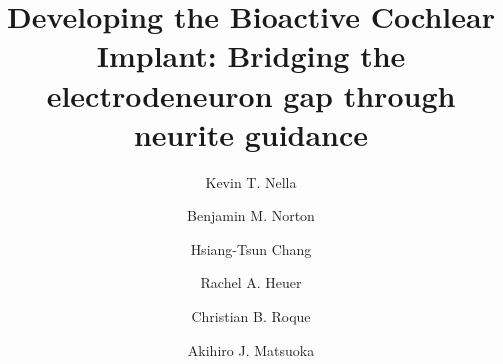 \documentclass[review]{elsarticle}
\begin{document}
\begin{frontmatter}
\title{Developing the Bioactive Cochlear Implant: Bridging the electrode\textendash neuron gap through neurite guidance}



\author[ENT,ME]{Kevin T. Nella}

\author[ENT]{Benjamin M. Norton}

\author[ENT]{Hsiang-Tsun Chang}

\author[ENT]{Rachel A. Heuer}

\author[ENT]{Christian B. Roque}

\author[ENT,SQI,CSD,KNOWLES]{Akihiro J. Matsuoka}

\address[ENT]{Department of Otolaryngology\textendash Head and Neck Surgery, Feinberg School of Medicine, Northwestern University, Chicago IL, 60611, USA}

\address[ME]{Department of Mechanical Engineering, Robert R. McCormick School of Engineering and Applied Science, Northwestern University, Evanston, IL., USA }

\address[SQI]{Simpson Querrey Institute, Chicago IL, 60611, USA}

\address[CSD]{Roxelyn and Richard Pepper Department of Communication Sciences and Disorders, School of Communication, Northwestern University, Evanston, IL., 60210, USA}

\address[KNOWLES] {The Hugh Knowles Center for Clinical and Basic Science in Hearing and its Disorders, Evanston, IL. 60210, USA}


\end{frontmatter}
\end{document}
